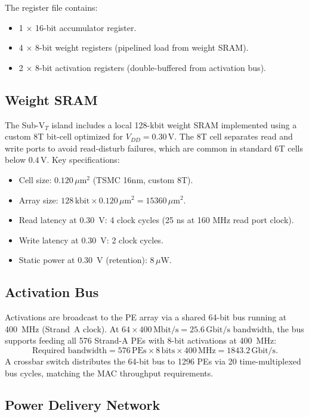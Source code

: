The register file contains:
\begin{itemize}
  \item 1 × 16-bit accumulator register.
  \item 4 × 8-bit weight registers (pipelined load from weight SRAM).
  \item 2 × 8-bit activation registers (double-buffered from activation bus).
\end{itemize}

\subsection{Weight SRAM}

The Sub-V$_T$ island includes a local 128-kbit weight SRAM implemented using a custom
8T bit-cell optimized for $V_{DD} = 0.30\,\text{V}$.  The 8T cell separates read and
write ports to avoid read-disturb failures, which are common in standard 6T cells below
$0.4\,\text{V}$.  Key specifications:
\begin{itemize}
  \item Cell size: $0.120\,\mu\text{m}^2$ (TSMC 16nm, custom 8T).
  \item Array size: $128\,\text{kbit} \times 0.120\,\mu\text{m}^2 = 15360\,\mu\text{m}^2$.
  \item Read latency at 0.30~V: 4 clock cycles (25 ns at 160 MHz read port clock).
  \item Write latency at 0.30~V: 2 clock cycles.
  \item Static power at 0.30~V (retention): $8\,\mu\text{W}$.
\end{itemize}

\subsection{Activation Bus}

Activations are broadcast to the PE array via a shared 64-bit bus running at 400~MHz
(Strand~A clock).  At $64 \times 400\,\text{Mbit/s} = 25.6\,\text{Gbit/s}$ bandwidth,
the bus supports feeding all 576 Strand-A PEs with 8-bit activations at 400~MHz:
\[
  \text{Required bandwidth} = 576\,\text{PEs} \times 8\,\text{bits} \times 400\,\text{MHz}
  = 1843.2\,\text{Gbit/s}.
\]
A crossbar switch distributes the 64-bit bus to 1296 PEs via 20 time-multiplexed bus
cycles, matching the MAC throughput requirements.

\subsection{Power Delivery Network}

